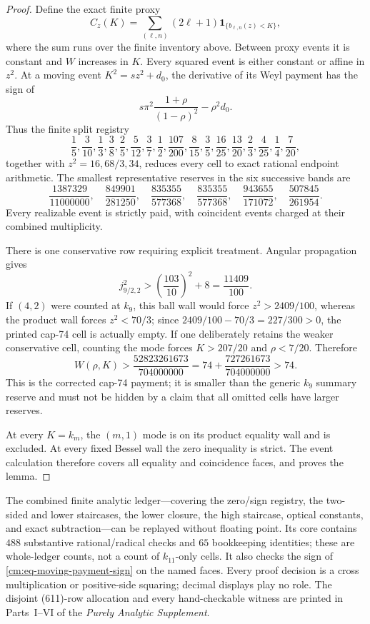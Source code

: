 \documentclass[11pt]{article}
\numberwithin{equation}{section}
\theoremstyle{definition}
\theoremstyle{remark}
\begin{document}
\begin{proof}
Define the exact finite proxy
\[
 C_z(K)=\sum_{(\ell,n)}(2\ell+1)
 \mathbf1_{\{b_{\ell,n}(z)<K\}},
\]
where the sum runs over the finite inventory above.  Between proxy events
it is constant and \(W\) increases in \(K\).  Every squared event is either
constant or affine in \(z^2\).  At a moving event \(K^2=sz^2+d_0\), the
derivative of its Weyl payment has the sign of
\begin{equation}
 s\pi^2\frac{1+\rho}{(1-\rho)^2}-\rho^2d_0.
 \label{cm:eq-moving-payment-sign}
\end{equation}
Thus the finite split registry
\[
\frac15,\frac3{10},\frac13,\frac38,\frac25,\frac5{12},\frac37,
\frac12,\frac{107}{200},\frac8{15},\frac35,\frac{16}{25},
\frac{13}{20},\frac23,\frac4{25},\frac14,\frac7{20},
\]
together with \(z^2=16,68/3,34\), reduces every cell to exact rational
endpoint arithmetic.  The smallest representative reserves in the six
successive bands are
\[
 \frac{1387329}{11000000},\quad
 \frac{849901}{281250},\quad
 \frac{835355}{577368},\quad
 \frac{835355}{577368},\quad
 \frac{943655}{171072},\quad
 \frac{507845}{261954}.
\]
Every realizable event is strictly paid, with coincident events charged at
their combined multiplicity.

There is one conservative row requiring explicit treatment.  Angular
propagation gives
\[
 j_{9/2,2}^2>\left(\frac{103}{10}\right)^2+8
 =\frac{11409}{100}.
\]
If \((4,2)\) were counted at \(k_9\), this ball wall would force
\(z^2>2409/100\), whereas the product wall forces \(z^2<70/3\); since
\(2409/100-70/3=227/300>0\), the printed cap-74 cell is actually empty.
If one deliberately retains the weaker conservative cell, counting the
mode forces \(K>207/20\) and \(\rho<7/20\).  Therefore
\begin{equation}
 W(\rho,K)>
 \frac{52823261673}{704000000}
 =74+\frac{727261673}{704000000}>74.
 \label{cm:eq-cap74}
\end{equation}
This is the corrected cap-74 payment; it is smaller than the generic
\(k_9\) summary reserve and must not be hidden by a claim that all omitted
cells have larger reserves.

At every \(K=k_m\), the \((m,1)\) mode is on its product equality wall
and is excluded.  At every fixed Bessel wall the zero inequality is strict.
The event calculation therefore covers all equality and coincidence faces,
and proves the lemma.
\end{proof}

The combined finite analytic ledger---covering the zero/sign registry, the
two-sided and lower staircases, the lower closure, the high staircase,
optical constants, and exact subtraction---can be replayed without floating
point.  Its core contains \(488\) substantive rational/radical checks and
\(65\) bookkeeping identities; these are whole-ledger counts, not a count of
\(k_{11}\)-only cells.  It also checks the sign of
\eqref{cm:eq-moving-payment-sign} on the named faces.  Every proof decision
is a cross multiplication or positive-side squaring; decimal displays play
  no role.  The disjoint (611)-row allocation and every hand-checkable
  witness are printed in Parts~I--VI of the \emph{Purely Analytic Supplement}.
\end{document}
